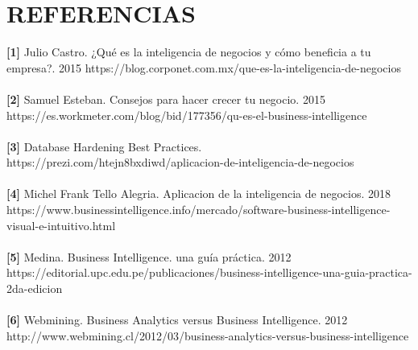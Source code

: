 \section{REFERENCIAS} 
		
\begin{enumerate}[1.]
	
\begin{thebibliography}
\textbf{[1]} Julio Castro. ¿Qué es la inteligencia de negocios y cómo beneficia a tu empresa?. 2015 https://blog.corponet.com.mx/que-es-la-inteligencia-de-negocios\\\\

\textbf{[2]} Samuel Esteban. Consejos para hacer crecer tu negocio. 2015 https://es.workmeter.com/blog/bid/177356/qu-es-el-business-intelligence\\\\

\textbf{[3]} Database Hardening Best Practices. https://prezi.com/htejn8bxdiwd/aplicacion-de-inteligencia-de-negocios\\\\

\textbf{[4]} Michel Frank Tello Alegria. Aplicacion de la inteligencia de negocios. 2018 https://www.businessintelligence.info/mercado/software-business-intelligence-visual-e-intuitivo.html\\\\

\textbf{[5]} 
Medina. Business Intelligence. una guía práctica. 2012 https://editorial.upc.edu.pe/publicaciones/business-intelligence-una-guia-practica-2da-edicion\\\\

\textbf{[6]} Webmining. Business Analytics versus Business Intelligence. 2012 http://www.webmining.cl/2012/03/business-analytics-versus-business-intelligence\\\\


\end{thebibliography}


\end{enumerate}

